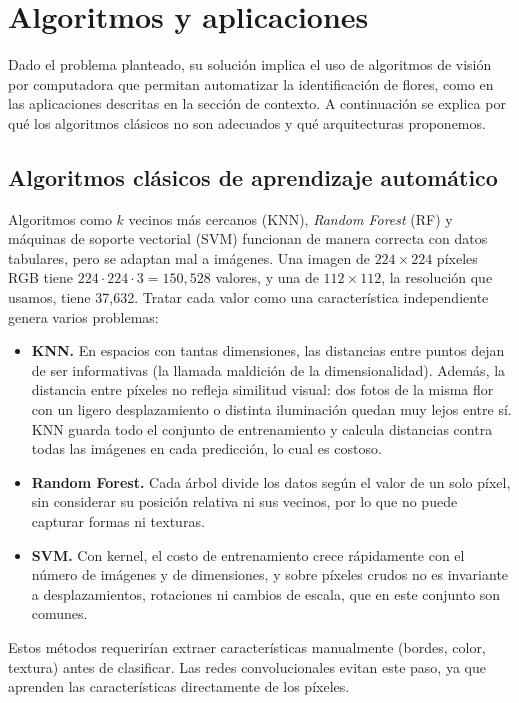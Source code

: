 \section{Algoritmos y aplicaciones}
\label{sec:algoritmos}

Dado el problema planteado, su solución implica el uso de algoritmos de visión
por computadora que permitan automatizar la identificación de flores, como en
las aplicaciones descritas en la sección de contexto. A continuación se explica
por qué los algoritmos clásicos no son adecuados y qué arquitecturas proponemos.

\subsection{Algoritmos clásicos de aprendizaje automático}

Algoritmos como $k$ vecinos más cercanos (KNN), \textit{Random Forest} (RF) y
máquinas de soporte vectorial (SVM) funcionan de manera correcta con datos
tabulares, pero se adaptan mal a imágenes. Una imagen de $224\times224$ píxeles
RGB tiene $224\cdot224\cdot3 = 150{,}528$ valores, y una de $112\times112$, la
resolución que usamos, tiene 37,632. Tratar cada valor como una característica
independiente genera varios problemas:

\begin{itemize}
\item \textbf{KNN.} En espacios con tantas dimensiones, las distancias entre
puntos dejan de ser informativas (la llamada maldición de la dimensionalidad).
Además, la distancia entre píxeles no refleja similitud visual: dos fotos de la
misma flor con un ligero desplazamiento o distinta iluminación quedan muy lejos
entre sí. KNN guarda todo el conjunto de entrenamiento y calcula distancias
contra todas las imágenes en cada predicción, lo cual es costoso.
\item \textbf{Random Forest.} Cada árbol divide los datos según el valor de un
solo píxel, sin considerar su posición relativa ni sus vecinos, por lo que no
puede capturar formas ni texturas.
\item \textbf{SVM.} Con kernel, el costo de entrenamiento crece rápidamente con
el número de imágenes y de dimensiones, y sobre píxeles crudos no es invariante
a desplazamientos, rotaciones ni cambios de escala, que en este conjunto son
comunes.
\end{itemize}

Estos métodos requerirían extraer características manualmente (bordes, color,
textura) antes de clasificar. Las redes convolucionales evitan este paso, ya que
aprenden las características directamente de los píxeles.


